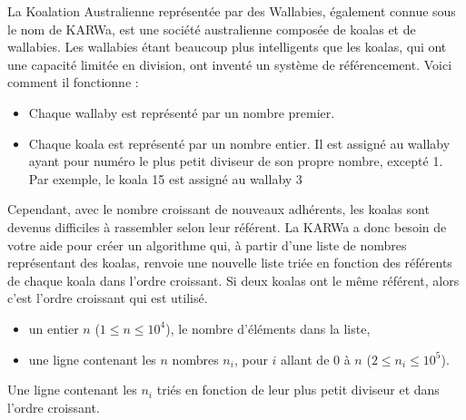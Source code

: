 \problemname{\problemyamlname}

La Koalation Australienne représentée par des Wallabies, également connue sous le nom de KARWa, est une société australienne composée de koalas et de wallabies. Les wallabies étant beaucoup plus intelligents que les koalas, qui ont une capacité limitée en division, ont inventé un système de référencement. Voici comment il fonctionne :

\begin{itemize}
	\item Chaque wallaby est représenté par un nombre premier.
	\item Chaque koala est représenté par un nombre entier. Il est assigné au wallaby ayant pour numéro le plus petit diviseur de son propre nombre, excepté 1. Par exemple, le koala 15 est assigné au wallaby 3
\end{itemize}
Cependant, avec le nombre croissant de nouveaux adhérents, les koalas sont devenus difficiles à rassembler selon leur référent. La KARWa a donc besoin de votre aide pour créer un algorithme qui, à partir d'une liste de nombres représentant des koalas, renvoie une nouvelle liste triée en fonction des référents de chaque koala dans l'ordre croissant. Si deux koalas ont le même référent, alors c'est l'ordre croissant qui est utilisé.

\begin{Input}
	\begin{itemize}
		\item un entier $n$ ($1 \leq n \leq 10^4$), le nombre d'éléments dans la liste,
		\item une ligne contenant les $n$ nombres $n_i$, pour $i$ allant de $0$ à $n$ ($2 \leq n_i \leq 10^5$).
	\end{itemize}
\end{Input}

\begin{Output}
	Une ligne contenant les $n_i$ triés en fonction de leur plus petit diviseur et dans l'ordre croissant.
\end{Output}
